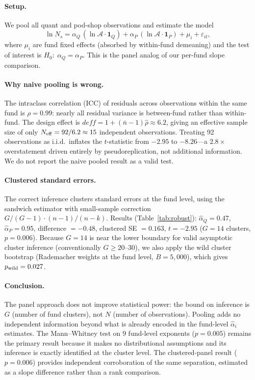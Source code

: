\documentclass[10pt,onecolumn]{article}
\newcommand{\Ns}{N_{s}}
\newcommand{\Ac}{\mathcal{A}}
\begin{document}
\paragraph{Setup.}
We pool all quant and pod-shop observations and estimate the model
\begin{equation}
  \label{eq:panel}
  \ln\Ns = \alpha_Q\,(\ln\Ac \cdot \mathbf{1}_Q) +
            \alpha_P\,(\ln\Ac \cdot \mathbf{1}_P) + \mu_i + \varepsilon_{it},
\end{equation}
where $\mu_i$ are fund fixed effects (absorbed by within-fund
demeaning) and the test of interest is
$H_0{:}\;\alpha_Q = \alpha_P$.
This is the panel analog of our per-fund slope comparison.

\paragraph{Why naive pooling is wrong.}
The intraclass correlation (ICC) of residuals across observations
within the same fund is $\hat\rho = 0.99$: nearly all residual
variance is between-fund rather than within-fund.
The design effect is
$\mathit{deff} = 1 + (\bar n - 1)\hat\rho \approx 6.2$,
giving an effective sample size of only
$N_{\rm eff} = 92/6.2 \approx 15$ independent observations.
Treating 92 observations as i.i.d.\
inflates the $t$-statistic from $-2.95$ to $-8.26$---a $2.8\times$
overstatement driven entirely by pseudoreplication, not additional
information.
We do not report the naive pooled result as a valid test.

\paragraph{Clustered standard errors.}
The correct inference clusters standard errors at the fund level,
using the sandwich estimator with small-sample correction
$G/(G-1)\cdot(n-1)/(n-k)$.
Results (Table~\ref{tab:robust}):
$\hat\alpha_Q = 0.47$, $\hat\alpha_P = 0.95$,
difference $= -0.48$, clustered SE $= 0.163$,
$t = -2.95$ ($G{=}14$ clusters, $p = 0.006$).
Because $G{=}14$ is near the lower boundary for valid asymptotic
cluster inference (conventionally $G \geq 20$--30), we also apply
the wild cluster bootstrap (Rademacher weights at the fund level,
$B{=}5{,}000$), which gives $p_{\rm wild} = 0.027$.

\paragraph{Conclusion.}
The panel approach does not improve statistical power:
the bound on inference is $G$ (number of fund clusters),
not $N$ (number of observations).
Pooling adds no independent information beyond what is already
encoded in the fund-level $\hat\alpha_i$ estimates.
The Mann--Whitney test on 9 fund-level exponents ($p = 0.005$)
remains the primary result because it makes no distributional
assumptions and its inference is exactly identified at the
cluster level.
The clustered-panel result ($p = 0.006$) provides independent
corroboration of the same separation, estimated as a slope
difference rather than a rank comparison.
\end{document}
